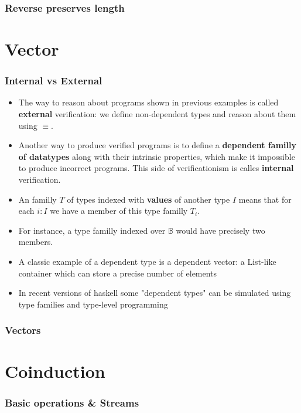 \documentclass[xetex]{beamer}
\begin{document}
\begin{frame}
\frametitle{Reverse preserves length}
\end{frame}

\section{Vector}

\begin{frame}
  \frametitle{Internal vs External}
  \begin{itemize}
  \item The way to reason about programs shown in previous examples is called
  \textbf{external} verification: we define non-dependent types and reason about them using $\equiv$.
\item Another way to produce verified programs is to define a
  \textbf{dependent familly of datatypes} along with their
  intrinsic properties, which make it impossible to produce incorrect programs.
  This side of verificationism is calles \textbf{internal} verification.
\item An familly $T$ of types indexed with \textbf{values}
  of another type $I$ means that for each $i:I$ we have a member of this type familly $T_i$.
\item For instance, a type familly indexed over $\mathbb{B}$ would have precisely two members.
\item A classic example of a dependent type is a dependent vector: a List-like container which can store a precise number of elements
\item In recent versions of haskell some "dependent types" can be simulated
  using type families and type-level programming
  \end{itemize}
  
\end{frame}

\begin{frame}
\frametitle{Vectors}
\end{frame}

\section{Coinduction}

\begin{frame}
\frametitle{Basic operations \& Streams}
\end{frame}
\end{document}
